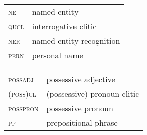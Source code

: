 \documentclass[output=paper]{langsci/langscibook}
\begin{document}
\noindent
\begin{tabularx}{.47\textwidth}{ll}
\textsc{ne}  & named entity \\
\textsc{qucl} & interrogative clitic \\
\textsc{ner}  &  named entity recognition  \\
 \textsc{pern}  & personal name \\
\end{tabularx}
\begin{tabularx}{.52\textwidth}{ll}
 \textsc{possadj}  & possessive adjective \\
(\textsc{poss)cl}  & (possessive) pronoun clitic \\
\textsc{posspron}  & possessive pronoun \\
 \textsc{pp}  & prepositional phrase \\
\end{tabularx} 

\sloppy
\printbibliography[heading=subbibliography,notkeyword=this]
\end{document}
